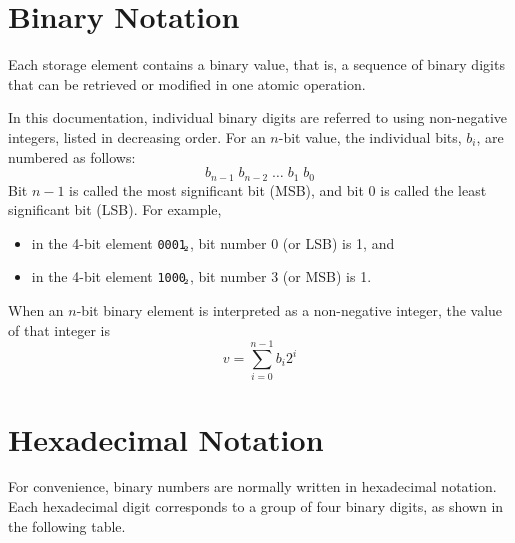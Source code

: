 \documentclass[a4paper,12pt]{article}
\newcommand{\num}[1]{\texttt{#1}\xspace}
\newcommand{\bin}[1]{\num{#1}$_{\textup{\tiny\hskip-1ex 2}}$\xspace}
\begin{document}
\appendix

\section{Binary Notation}
\label{sec:binary-notation}

Each storage element contains a binary value, that is, a sequence of binary digits that can be retrieved or modified in one atomic operation.

In this documentation, individual binary digits are referred to using non-negative integers, listed in decreasing order.
For an $n$-bit value, the individual bits, $b_i$, are numbered as follows:
\[ b_{n-1} \; b_{n-2} \; \ldots \; b_{1} \; b_{0} \]
Bit $n-1$ is called the most significant bit (MSB), and bit 0 is called the least significant bit (LSB).
For example,
\begin{itemize}
\item in the 4-bit element \bin{0001}, bit number 0 (or LSB) is 1, and
\item in the 4-bit element \bin{1000}, bit number 3 (or MSB) is 1.
\end{itemize}

When an $n$-bit binary element is interpreted as a non-negative integer, the value of that integer is
\[
    v = \sum_{i=0}^{n-1} b_{i}2^{i}
\]

\section{Hexadecimal Notation}
\label{sec:hexadecimal-notation}

For convenience, binary numbers are normally written in hexadecimal notation.
Each hexadecimal digit corresponds to a group of four binary digits, as shown in the following table.
\end{document}
